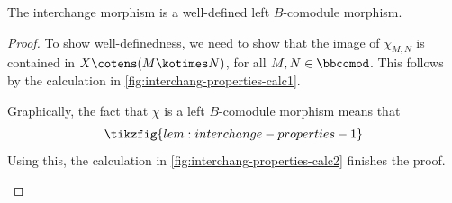 \begin{lemma}\label{lem:interchange-properties}
  The interchange morphism
  is a well-defined left \(B\)\hyp{}comodule morphism.
\end{lemma}
\begin{proof}
  To show well-definedness,
  we need to show that the image of \(\chi_{M, N}\) is contained in \(X \cotens (M \kotimes N)\),
  for all \(M, N \in \bbcomod \).
  This follows by the calculation in \cref{fig:interchang-properties-calc1}.
  \begin{figure}[htbp]
    \centering
    \vspace{-0.3cm}\vspace{-0.3cm}%
  \end{figure}

  Graphically, the fact that \(\chi\) is a left \(B\)\hyp{}comodule morphism means that
  \[
    \tikzfig{lem:interchange-properties-1}
  \]
  Using this, the calculation in \cref{fig:interchang-properties-calc2} finishes the proof.
  \begin{figure}[htbp]
    \centering
    \vspace{-0.3cm}%
  \end{figure}
\end{proof}

